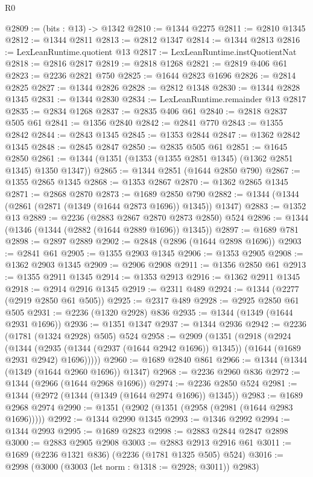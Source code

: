\begin{lexlean}{R0}
\begin{coremodule}
@2809 := (bits : @13) -> @1342
@2810 := @1344 @2275
@2811 := @2810 @1345
@2812 := @1344 @2811
@2813 := @2812 @1347
@2814 := @1344 @2813
@2816 := LexLeanRuntime.quotient @13
@2817 := LexLeanRuntime.instQuotientNat
@2818 := @2816 @2817
@2819 := @2818 @1268
@2821 := @2819 @406 @61
@2823 := @2236 @2821 @750
@2825 := @1644 @2823 @1696
@2826 := @2814 @2825
@2827 := @1344 @2826
@2828 := @2812 @1348
@2830 := @1344 @2828 @1345
@2831 := @1344 @2830
@2834 := LexLeanRuntime.remainder @13 @2817
@2835 := @2834 @1268
@2837 := @2835 @406 @61
@2840 := @2818 @2837 @505 @61
@2841 := @1356 @2840
@2842 := @2841 @770
@2843 := @1355 @2842
@2844 := @2843 @1345
@2845 := @1353 @2844
@2847 := @1362 @2842 @1345
@2848 := @2845 @2847
@2850 := @2835 @505 @61
@2851 := @1645 @2850
@2861 := @1344 (@1351 (@1353 (@1355 @2851 @1345) (@1362 @2851 @1345) @1350 @1347))
@2865 := @1344 @2851 (@1644 @2850 @790)
@2867 := @1355 @2865 @1345
@2868 := @1353 @2867
@2870 := @1362 @2865 @1345
@2871 := @2868 @2870
@2873 := @1689 @2850 @790
@2882 := @1344 (@1344 (@2861 (@2871 (@1349 (@1644 @2873 @1696)) @1345)) @1347)
@2883 := @1352 @13
@2889 := @2236 (@2883 @2867 @2870 @2873 @2850) @524
@2896 := @1344 (@1346 (@1344 (@2882 (@1644 @2889 @1696)) @1345))
@2897 := @1689 @781
@2898 := @2897 @2889
@2902 := @2848 (@2896 (@1644 @2898 @1696))
@2903 := @2841 @61
@2905 := @1355 @2903 @1345
@2906 := @1353 @2905
@2908 := @1362 @2903 @1345
@2909 := @2906 @2908
@2911 := @1356 @2850 @61
@2913 := @1355 @2911 @1345
@2914 := @1353 @2913
@2916 := @1362 @2911 @1345
@2918 := @2914 @2916 @1345
@2919 := @2311 @489
@2924 := @1344 (@2277 (@2919 @2850 @61 @505))
@2925 := @2317 @489
@2928 := @2925 @2850 @61 @505
@2931 := @2236 (@1320 @2928) @836
@2935 := @1344 (@1349 (@1644 @2931 @1696))
@2936 := @1351 @1347
@2937 := @1344 @2936
@2942 := @2236 (@1781 (@1324 @2928) @505) @524
@2958 := @2909
    (@1351
      (@2918
        (@2924
          (@1344
            (@2935 (@1344 (@2937 (@1644 @2942 @1696)) @1345))
            (@1644 (@1689 @2931 @2942) @1696)))))
@2960 := @1689 @2840 @861
@2966 := @1344 (@1344 (@1349 (@1644 @2960 @1696)) @1347)
@2968 := @2236 @2960 @836
@2972 := @1344 (@2966 (@1644 @2968 @1696))
@2974 := @2236 @2850 @524
@2981 := @1344 (@2972 (@1344 (@1349 (@1644 @2974 @1696)) @1345))
@2983 := @1689 @2968 @2974
@2990 := @1351 (@2902 (@1351 (@2958 (@2981 (@1644 @2983 @1696)))))
@2992 := @1344 @2990 @1345
@2993 := @1346 @2992
@2994 := @1344 @2993
@2995 := @1689 @2823
@2998 := @2883 @2844 @2847 @2898
@3000 := @2883 @2905 @2908
@3003 := @2883 @2913 @2916 @61
@3011 := @1689 (@2236 @1321 @836) (@2236 (@1781 @1325 @505) @524)
@3016 := @2998 (@3000 (@3003 (let norm : @1318 := @2928; @3011)) @2983)

\end{coremodule}
\end{lexlean}

